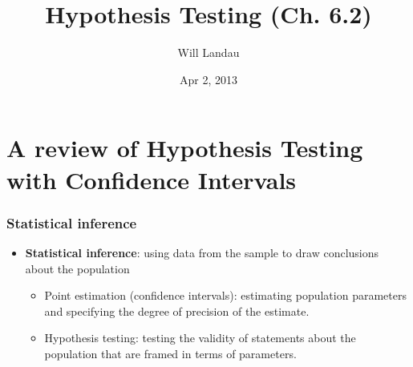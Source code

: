 \documentclass[handout]{beamer}\usepackage{graphicx, color}
\title{Hypothesis Testing (Ch. 6.2)}
\author{Will Landau}
\date{Apr 2, 2013}
\institute{Iowa State University}
\numberwithin{equation}{section}
\begin{document}
\begin{frame}
\titlepage
 \end{frame}
 

\section{A review of Hypothesis Testing with Confidence Intervals}

\begin{frame}
\frametitle{Statistical inference}
\begin{itemize}
\item {\bf Statistical inference}: using data from the sample to draw conclusions about the population 
\begin{itemize}
\pause \item Point estimation (confidence intervals): estimating population parameters and specifying the degree of precision of the estimate.
\pause \item Hypothesis testing: testing the validity of statements about the population that are framed in terms of parameters. 
\end{itemize}
\end{itemize}
\end{frame}
\end{document}
